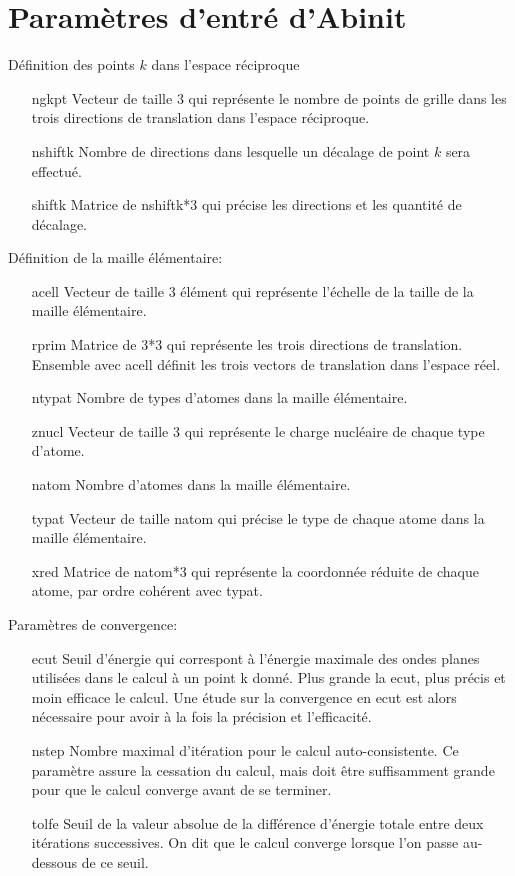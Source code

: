 \documentclass[12pt, french]{report}
\theoremstyle{theoreme}
\begin{document}
\section{Paramètres d'entré d'Abinit}
Définition des points $k$ dans l'espace réciproque
\begin{itemize}[leftmargin=0em, font=\bfseries]
  \item[ngkpt] Vecteur de taille 3 qui représente le nombre de points de grille dans les trois directions de translation dans l'espace réciproque.
  \item[nshiftk] Nombre de directions dans lesquelle un décalage de point $k$ sera effectué.
  \item[shiftk] Matrice de nshiftk*3 qui précise les directions et les quantité de décalage.
\end{itemize}
Définition de la maille élémentaire:
\begin{itemize}[leftmargin=0em, font=\bfseries]
  \item[acell] Vecteur de taille 3 élément qui représente l'échelle de la taille de la maille élémentaire.
  \item[rprim] Matrice de 3*3 qui représente les trois directions de translation.
    Ensemble avec acell définit les trois vectors de translation dans l'espace réel.
  \item[ntypat] Nombre de types d'atomes dans la maille élémentaire.
  \item[znucl] Vecteur de taille 3 qui représente le charge nucléaire de chaque type d'atome.
  \item[natom] Nombre d'atomes dans la maille élémentaire.
  \item[typat] Vecteur de taille natom qui précise le type de chaque atome dans la maille élémentaire.
  \item[xred] Matrice de natom*3 qui représente la coordonnée réduite de chaque atome,
    par ordre cohérent avec typat.
\end{itemize}
Paramètres de convergence:
\begin{itemize}[leftmargin=0em, font=\bfseries]
  \item[ecut] Seuil d'énergie qui correspont à l'énergie maximale des ondes planes utilisées dans le calcul à un point k donné.
    Plus grande la ecut, plus précis et moin efficace le calcul.
    Une étude sur la convergence en ecut est alors nécessaire pour avoir à la fois la précision et l'efficacité.
  \item[nstep] Nombre maximal d'itération pour le calcul auto-consistente.
    Ce paramètre assure la cessation du calcul, mais doit être suffisamment grande pour que le calcul converge avant de se terminer.
  \item[tolfe] Seuil de la valeur absolue de la différence d'énergie totale entre deux itérations successives.
    On dit que le calcul converge lorsque l'on passe au-dessous de ce seuil.
\end{itemize}
\end{document}
